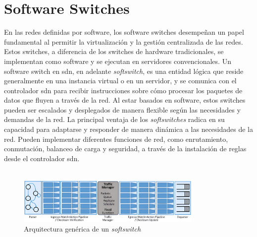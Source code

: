 \section{Software Switches }
\label{sec:softSwitchs}

En las redes definidas por software, los software switches desempeñan un papel fundamental al permitir la virtualización y la gestión centralizada de las redes. Estos switches, a diferencia de los switches de hardware tradicionales, se implementan como software y se ejecutan en servidores convencionales. Un software switch en \gls{sdn}, en adelante \textit{softswitch}, es una entidad lógica que reside generalmente en una instancia virtual o en un servidor, y se comunica con el controlador \gls{sdn} para recibir instrucciones sobre cómo procesar los paquetes de datos que fluyen a través de la red. Al estar basados en software, estos switches pueden ser escalados y desplegados de manera flexible según las necesidades y demandas de la red. La principal ventaja de los \textit{softswitches} radica en su capacidad para adaptarse y responder de manera dinámica a las necesidades de la red. Pueden implementar diferentes funciones de red, como enrutamiento, conmutación, balanceo de carga y seguridad, a través de la instalación de reglas desde el controlador \gls{sdn}. \\
\\
\begin{figure}[ht]
    \centering
    \includegraphics[width=0.8\textwidth]{archivos/img/teoria/softswitch.jpg}
    \caption{Arquitectura genérica de un \textit{softswitch}  \cite{softswitches1}}
    \label{fig:softswitch}
\end{figure}

